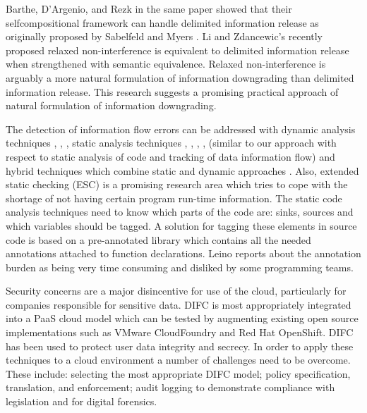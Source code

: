 Barthe, D'Argenio, and Rezk in the same paper showed that their selfcompositional framework can handle delimited information release as originally proposed by Sabelfeld and Myers \cite{ref_72_sabelfeld2004model}. Li and Zdancewic's
recently proposed relaxed non-interference \cite{ref_73_li2005downgrading} is equivalent to delimited information release when strengthened with semantic equivalence. Relaxed non-interference is arguably a more natural formulation of information downgrading than delimited
information release. This research suggests a promising practical approach of natural formulation of information downgrading.


The detection of information flow errors can be
addressed with dynamic analysis techniques \cite{ref_44_avgerinos:aeg}, \cite{ref_43_fenton:memoryless}, \cite{ref_42_sabelfeld:dynamic},
static analysis techniques \cite{ref_41_guarnieri:security}, \cite{ref_40_myers:jflow}, \cite{ref_39_simonet:report}, \cite{ref_38_volpano:sound}, \cite{ref_37_xiao:transparent} (similar
to our approach with respect to static analysis of code and
tracking of data information flow) and hybrid techniques which
combine static and dynamic approaches \cite{ref_36_moore:static}. Also, extended
static checking \cite{ref_35_david:extended} (ESC) is a promising research area which
tries to cope with the shortage of not having certain program
run-time information.
The static code analysis techniques need to know which
parts of the code are: sinks, sources and which variables
should be tagged. A solution for tagging these elements in
source code is based on a pre-annotated library which contains
all the needed annotations attached to function declarations.
Leino \cite{ref_34_leino:10years} reports about the annotation burden as being very
time consuming and disliked by some programming teams.

Security concerns are a major disincentive for use of the
cloud, particularly for companies responsible for sensitive
data. DIFC \cite{ref_74_bacon2014information} is most appropriately integrated into a PaaS cloud model which can be tested by augmenting
existing open source implementations such as VMware CloudFoundry
and Red Hat OpenShift. DIFC has been used to protect user
data integrity and secrecy. In order to apply these techniques
to a cloud environment a number of challenges need to be
overcome. These include: selecting the most appropriate DIFC
model; policy specification, translation, and enforcement; audit
logging to demonstrate compliance with legislation and for
digital forensics.


